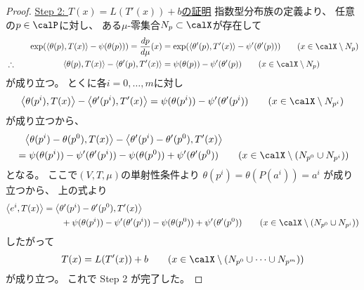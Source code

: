 \documentclass[report]{jlreq}
\begin{document}
\begin{proof}
    \uline{Step 2: $T(x) = L(T'(x)) + b$の証明} \quad
    指数型分布族の定義より、
    任意の$p \in \calP$に対し、
    ある$\mu$-零集合$N_p \subset \calX$が存在して
    \begin{alignat}{2}
        &\phantom{\therefore}& \quad
            \exp(\myangle{\theta(p)}{T(x)} - \psi(\theta(p)))
                =
                    \dd[p]{\mu}(x)
                &=
                    \exp(\myangle{\theta'(p)}{T'(x)} - \psi'(\theta'(p)))
                \qquad
                    (x \in \calX \setminus N_p)
            \\
        &\therefore& \quad
            \myangle{\theta(p)}{T(x)}
                - \myangle{\theta'(p)}{T'(x)}
                &=
                    \psi(\theta(p))
                    - \psi'(\theta'(p))
                \qquad
                    (x \in \calX \setminus N_p)
    \end{alignat}
    が成り立つ。
    とくに各$i = 0, \dots, m$に対し
    \begin{equation}
        \myangle{\theta(p^i)}{T(x)}
            - \myangle{\theta'(p^i)}{T'(x)}
            =
                \psi(\theta(p^i))
                - \psi'(\theta'(p^i))
            \qquad
                (x \in \calX \setminus N_{p^i})
    \end{equation}
    が成り立つから、
    \begin{equation}
        \begin{alignedat}{1}
            &\phantom{=}
                \myangle{\theta(p^i) - \theta(p^0)}{T(x)}
                - \myangle{\theta'(p^i) - \theta'(p^0)}{T'(x)}
                \\
            &=
                \psi(\theta(p^i))
                - \psi'(\theta'(p^i))
                - \psi(\theta(p^0))
                + \psi'(\theta'(p^0))
                \qquad
                (x \in \calX \setminus (N_{p^0} \cup N_{p^i}))
        \end{alignedat}
    \end{equation}
    となる。
    ここで$(V, T, \mu)$の単射性条件より
    $\theta(p^i) = \theta(P(a^i)) = a^i$
    が成り立つから、
    上の式より
    \begin{equation}
        \begin{alignedat}{1}
            \myangle{e^i}{T(x)}
                &=
                    \myangle{\theta'(p^i) - \theta'(p^0)}{T'(x)}
                    \\
                &\qquad
                    + \psi(\theta(p^i))
                    - \psi'(\theta'(p^i))
                    - \psi(\theta(p^0))
                    + \psi'(\theta'(p^0))
                    \qquad
                    (x \in \calX \setminus (N_{p^0} \cup N_{p^i}))
        \end{alignedat}
    \end{equation}
    したがって
    \begin{equation}
        T(x) = L(T'(x)) + b
            \qquad
                (x \in \calX \setminus (N_{p^0} \cup \cdots \cup N_{p^m}))
    \end{equation}
    が成り立つ。
    これで Step 2 が完了した。


\end{proof}
\end{document}
